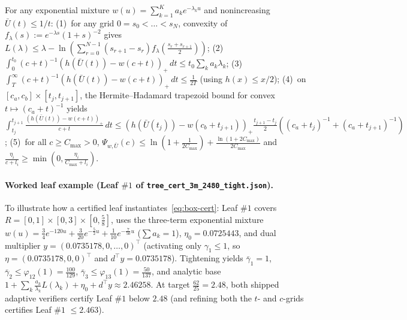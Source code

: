 \begin{lemma}\label{lem:tails}
For any exponential mixture $w(u) = \sum_{k=1}^K a_k e^{-\lambda_k u}$ and nonincreasing $\bar{U}(t) \le 1/t$:
(1)~for any grid $0 = s_0 < \dots < s_N$, convexity of $f_\lambda(s) := e^{-\lambda s}(1+s)^{-2}$ gives $L(\lambda) \le \lambda - \ln(\sum_{r=0}^{N-1}(s_{r+1}-s_r)f_\lambda(\frac{s_r+s_{r+1}}{2}))$;
(2)~$\int_0^{t_0} (c+t)^{-1}(h(\bar{U}(t))-w(c+t))_+\,dt \le t_0 \sum_k a_k\lambda_k$;
(3)~$\int_T^\infty (c+t)^{-1}(h(\bar{U}(t))-w(c+t))_+\,dt \le \frac{1}{2T}$ (using $h(x) \le x/2$);
(4)~on $[c_a,c_b] \times [t_j,t_{j+1}]$, the Hermite--Hadamard trapezoid bound for convex $t \mapsto (c_a+t)^{-1}$ yields $\int_{t_j}^{t_{j+1}} \frac{(h(\bar{U}(t))-w(c+t))_+}{c+t}\,dt \le (h(\bar{U}(t_j))-w(c_b+t_{j+1}))_+\frac{t_{j+1}-t_j}{2}((c_a+t_j)^{-1}+(c_a+t_{j+1})^{-1})$;
(5)~for all $c \ge C_{\max} > 0$, $\Psi_{w,\bar{U}}(c) \le \ln(1+\frac{1}{2C_{\max}}) + \frac{\ln(1+2C_{\max})}{2C_{\max}}$ and $\frac{\eta_i}{c+l_i} \ge \min(0, \frac{\eta_i}{C_{\max}+l_i})$.
\end{lemma}

\paragraph{Worked leaf example (Leaf $\#1$ of \texttt{tree\_cert\_3m\_2480\_tight.json}).}
To illustrate how a certified leaf instantiates~\eqref{eq:box-cert}: Leaf $\#1$ covers $R = [0, 1] \times [0, 3] \times [0, \frac{5}{8}]$, uses the three-term exponential mixture $w(u) = \frac{3}{4}e^{-120 u} + \frac{3}{20}e^{-\frac{5}{2}u} + \frac{1}{10}e^{-\frac{7}{50}u}$ ($\sum a_k = 1$), $\eta_0 = 0.0725443$, and dual multiplier $y = (0.0735178, 0, \dots, 0)^\top$ (activating only $\gamma_1 \le 1$, so $\eta = (0.0735178, 0, 0)^\top$ and $d^\top y = 0.0735178$). Tightening yields $\bar{\gamma}_1 = 1$, $\bar{\gamma}_2 \le \varphi_{12}(1) = \frac{100}{129}$, $\bar{\gamma}_3 \le \varphi_{13}(1) = \frac{50}{137}$, and analytic base $1 + \sum_k \frac{a_k}{\lambda_k}L(\lambda_k) + \eta_0 + d^\top y \approx 2.46258$. At target $\frac{62}{25} = 2.48$, both shipped adaptive verifiers certify Leaf $\#1$ below $2.48$ (and refining both the $t$- and $c$-grids certifies Leaf $\#1$ $\le 2.463$).

